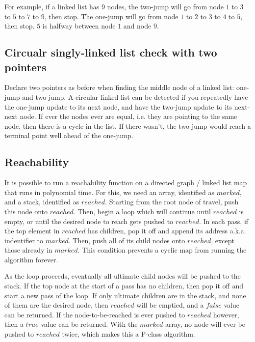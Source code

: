 \documentclass[12pt]{article}
\begin{document}
	For example, if a linked list has $9$ nodes, the two-jump will go from node $1$ to $3$ to $5$ to $7$ to $9$, then stop. The one-jump will go from node $1$ to $2$ to $3$ to $4$ to $5$, then stop. $5$ is halfway between node $1$ and node $9$.

	\subsection{Circualr singly-linked list check with two pointers}
	Declare two pointers as before when finding the middle node of a linked list: one-jump and two-jump. A circular linked list can be detected if you repeatedly have the one-jump update to its next node, and have the two-jump update to its next-next node. If ever the nodes ever are equal, i.e. they are pointing to the same node, then there is a cycle in the list. If there wasn't, the two-jump would reach a terminal point well ahead of the one-jump.

	\subsection{Reachability}
	It is possible to run a reachability function on a directed graph / linked list map that runs in polynomial time. For this, we need an array, identified as $marked$, and a stack, identified as $reached$. Starting from the root node of travel, push this node onto $reached$. Then, begin a loop which will continue until $reached$ is empty, or until the desired node to reach gets pushed to $reached$. In each pass, if the top element in $reached$ has children, pop it off and append its address a.k.a. indentifier to $marked$. Then, push all of its child nodes onto $reached$, except those already in $marked$. This condition prevents a cyclic map from running the algorithm forever. \linebreak

	As the loop proceeds, eventually all ultimate child nodes will be pushed to the stack. If the top node at the start of a pass has no children, then pop it off and start a new pass of the loop. If only ultimate children are in the stack, and none of them are the desired node, then $reached$ will be emptied, and a $false$ value can be returned. If the node-to-be-reached is ever pushed to $reached$ however, then a $true$ value can be returned. With the $marked$ array, no node will ever be pushed to $reached$ twice, which makes this a P-class algorithm. \pagebreak
\end{document}

